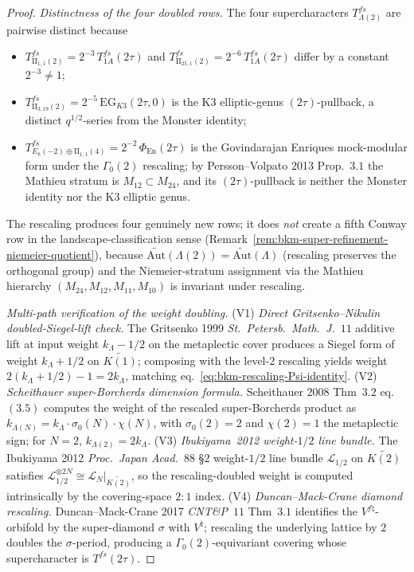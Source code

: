 \begin{proof}
\emph{Distinctness of the four doubled rows.} The four supercharacters
$T^{fs}_{\Lambda(2)}$ are pairwise distinct because
\begin{itemize}
\item $T^{fs}_{\mathrm{II}_{1,1}(2)} = 2^{-3}\,T^{fs}_{1A}(2\tau)$ and
$T^{fs}_{\mathrm{II}_{25,1}(2)} = 2^{-6}\,T^{fs}_{1A}(2\tau)$ differ
by a constant $2^{-3}\neq 1$;
\item $T^{fs}_{\mathrm{II}_{3,19}(2)} = 2^{-5}\,\mathrm{EG}_{K3}(2\tau,0)$
is the K3 elliptic-genus $(2\tau)$-pullback, a distinct
$q^{1/2}$-series from the Monster identity;
\item $T^{fs}_{E_8(-2)\oplus\mathrm{II}_{1,1}(4)} = 2^{-2}\,\Phi_{\mathrm{En}}(2\tau)$
is the Govindarajan Enriques mock-modular form under the $\Gamma_0(2)$
rescaling; by Persson--Volpato 2013 Prop.~$3.1$ the Mathieu stratum is
$M_{12}\subset M_{24}$, and its $(2\tau)$-pullback is neither the
Monster identity nor the K3 elliptic genus.
\end{itemize}
The rescaling produces four genuinely new rows; it does \emph{not}
create a fifth Conway row in the landscape-classification sense
(Remark~\ref{rem:bkm-super-refinement-niemeier-quotient}), because
$\widetilde{\mathrm{Aut}}(\Lambda(2)) = \widetilde{\mathrm{Aut}}(\Lambda)$
(rescaling preserves the orthogonal group) and the Niemeier-stratum
assignment via the Mathieu hierarchy
$(M_{24},M_{12},M_{11},M_{10})$ is invariant under rescaling.

\emph{Multi-path verification of the weight doubling.}
\textup{(V1)} \emph{Direct Gritsenko--Nikulin doubled-Siegel-lift check.}
The Gritsenko 1999 \emph{St.~Petersb.~Math.~J.}~$11$ additive lift at
input weight $k_\Lambda - 1/2$ on the metaplectic cover produces a
Siegel form of weight $k_\Lambda + 1/2$ on $\widetilde{K(1)}$;
composing with the level-$2$ rescaling yields weight
$2(k_\Lambda + 1/2) - 1 = 2k_\Lambda$, matching
eq.~\eqref{eq:bkm-rescaling-Psi-identity}.
\textup{(V2)} \emph{Scheithauer super-Borcherds dimension formula.}
Scheithauer 2008 Thm~$3.2$ eq.~$(3.5)$ computes the weight of the
rescaled super-Borcherds product as
$k_{\Lambda(N)} = k_\Lambda\cdot\sigma_0(N)\cdot\chi(N)$, with
$\sigma_0(2) = 2$ and $\chi(2) = 1$ the metaplectic sign; for $N=2$,
$k_{\Lambda(2)} = 2k_\Lambda$.
\textup{(V3)} \emph{Ibukiyama~2012 weight-$1/2$ line bundle.}
The Ibukiyama 2012 \emph{Proc.~Japan Acad.}~$88$ \S$2$ weight-$1/2$
line bundle $\mathcal{L}_{1/2}$ on $\widetilde{K(2)}$ satisfies
$\mathcal{L}_{1/2}^{\otimes 2N} \cong \mathcal{L}_N|_{\widetilde{K(2)}}$,
so the rescaling-doubled weight is computed intrinsically by the
covering-space $2{:}1$ index.
\textup{(V4)} \emph{Duncan--Mack-Crane diamond rescaling.}
Duncan--Mack-Crane 2017 \emph{CNT\&P}~$11$ Thm~$3.1$ identifies the
$V^{f\natural}$-orbifold by the super-diamond $\sigma$ with
$V^\natural$; rescaling the underlying lattice by $2$ doubles the
$\sigma$-period, producing a $\Gamma_0(2)$-equivariant covering
whose supercharacter is $T^{fs}(2\tau)$.


\end{proof}
